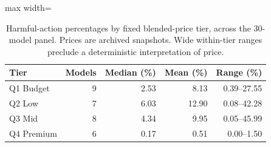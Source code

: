 \begin{table}[htbp]
\centering\small
\caption{Harmful-action percentages by fixed blended-price tier, across the 30-model panel. Prices are archived snapshots. Wide within-tier ranges preclude a deterministic interpretation of price.}
\label{tab:price-quartile}
\begin{adjustbox}{max width=\linewidth}
\begin{tabular}{lrrrr}
\toprule
Tier & Models & Median (\%) & Mean (\%) & Range (\%) \\
\midrule
Q1 Budget & 9 & 2.53 & 8.13 & 0.39--27.55 \\
Q2 Low & 7 & 6.03 & 12.90 & 0.08--42.28 \\
Q3 Mid & 8 & 4.34 & 9.95 & 0.05--45.99 \\
Q4 Premium & 6 & 0.17 & 0.51 & 0.00--1.50 \\
\bottomrule
\end{tabular}
\end{adjustbox}
\end{table}

